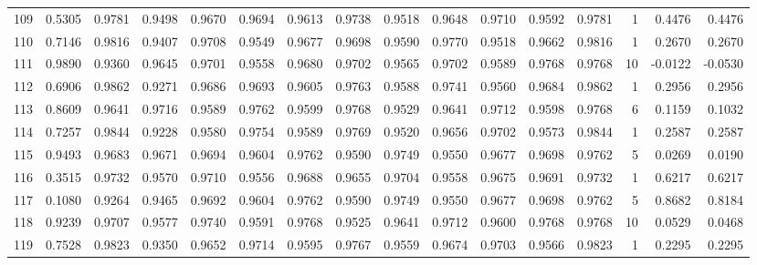 \begin{tabular}{lrrrrrrrrrrrrrrr}
109 &      0.5305 &  0.9781 &  0.9498 &  0.9670 &  0.9694 &  0.9613 &  0.9738 &  0.9518 &  0.9648 &  0.9710 &   0.9592 &     0.9781 &      1 &                    0.4476 &                     0.4476 \\
110 &      0.7146 &  0.9816 &  0.9407 &  0.9708 &  0.9549 &  0.9677 &  0.9698 &  0.9590 &  0.9770 &  0.9518 &   0.9662 &     0.9816 &      1 &                    0.2670 &                     0.2670 \\
111 &      0.9890 &  0.9360 &  0.9645 &  0.9701 &  0.9558 &  0.9680 &  0.9702 &  0.9565 &  0.9702 &  0.9589 &   0.9768 &     0.9768 &     10 &                   -0.0122 &                    -0.0530 \\
112 &      0.6906 &  0.9862 &  0.9271 &  0.9686 &  0.9693 &  0.9605 &  0.9763 &  0.9588 &  0.9741 &  0.9560 &   0.9684 &     0.9862 &      1 &                    0.2956 &                     0.2956 \\
113 &      0.8609 &  0.9641 &  0.9716 &  0.9589 &  0.9762 &  0.9599 &  0.9768 &  0.9529 &  0.9641 &  0.9712 &   0.9598 &     0.9768 &      6 &                    0.1159 &                     0.1032 \\
114 &      0.7257 &  0.9844 &  0.9228 &  0.9580 &  0.9754 &  0.9589 &  0.9769 &  0.9520 &  0.9656 &  0.9702 &   0.9573 &     0.9844 &      1 &                    0.2587 &                     0.2587 \\
115 &      0.9493 &  0.9683 &  0.9671 &  0.9694 &  0.9604 &  0.9762 &  0.9590 &  0.9749 &  0.9550 &  0.9677 &   0.9698 &     0.9762 &      5 &                    0.0269 &                     0.0190 \\
116 &      0.3515 &  0.9732 &  0.9570 &  0.9710 &  0.9556 &  0.9688 &  0.9655 &  0.9704 &  0.9558 &  0.9675 &   0.9691 &     0.9732 &      1 &                    0.6217 &                     0.6217 \\
117 &      0.1080 &  0.9264 &  0.9465 &  0.9692 &  0.9604 &  0.9762 &  0.9590 &  0.9749 &  0.9550 &  0.9677 &   0.9698 &     0.9762 &      5 &                    0.8682 &                     0.8184 \\
118 &      0.9239 &  0.9707 &  0.9577 &  0.9740 &  0.9591 &  0.9768 &  0.9525 &  0.9641 &  0.9712 &  0.9600 &   0.9768 &     0.9768 &     10 &                    0.0529 &                     0.0468 \\
119 &      0.7528 &  0.9823 &  0.9350 &  0.9652 &  0.9714 &  0.9595 &  0.9767 &  0.9559 &  0.9674 &  0.9703 &   0.9566 &     0.9823 &      1 &                    0.2295 &                     0.2295 \\

\end{tabular}
